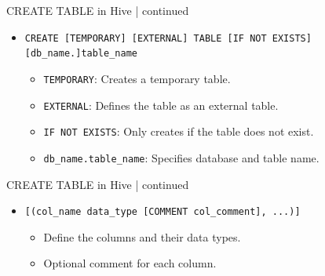\begin{frame}{CREATE TABLE in Hive | continued}
	\begin{tcolorbox}[colback=white,colframe=black,title= Part 1: Table Creation Basics]
		\small
		\begin{itemize}
			\item \texttt{CREATE [TEMPORARY] [EXTERNAL] TABLE [IF NOT EXISTS] [db\_name.]table\_name}
			\begin{itemize}
			  \item \texttt{TEMPORARY}: Creates a temporary table.
			  \item \texttt{EXTERNAL}: Defines the table as an external table.
			  \item \texttt{IF NOT EXISTS}: Only creates if the table does not exist.
			  \item \texttt{db\_name.table\_name}: Specifies database and table name.
			\end{itemize}
		  \end{itemize}
	\end{tcolorbox}

  \end{frame}
  \begin{frame}{CREATE TABLE in Hive | continued}
	\begin{tcolorbox}[colback=white,colframe=black,title= Part 2: Column Definitions]
		\small
		\begin{itemize}
		\item \texttt{[(col\_name data\_type [COMMENT col\_comment], ...)]}
			\begin{itemize}
				\item Define the columns and their data types.
				\item Optional comment for each column.
			\end{itemize}
		\end{itemize}
	\end{tcolorbox}
\end{frame}
